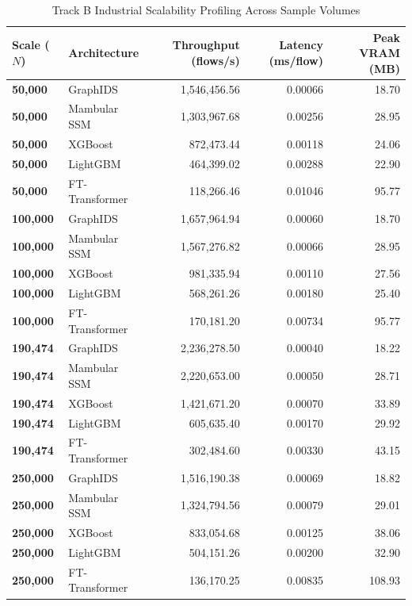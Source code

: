 \documentclass[10pt,a4paper]{article}
\begin{document}
\begin{table}[!ht]
\centering
\caption{Track B Industrial Scalability Profiling Across Sample Volumes}
\label{tab:scalability}
\footnotesize
\begin{tabular}{llrrr}
\toprule
\textbf{Scale ($N$)} & \textbf{Architecture} & \textbf{Throughput (flows/s)} & \textbf{Latency (ms/flow)} & \textbf{Peak VRAM (MB)} \\
\midrule
\textbf{50,000} & GraphIDS & 1,546,456.56 & 0.00066 & 18.70 \\
\textbf{50,000} & Mambular SSM & 1,303,967.68 & 0.00256 & 28.95 \\
\textbf{50,000} & XGBoost & 872,473.44 & 0.00118 & 24.06 \\
\textbf{50,000} & LightGBM & 464,399.02 & 0.00288 & 22.90 \\
\textbf{50,000} & FT-Transformer & 118,266.46 & 0.01046 & 95.77 \\
\midrule
\textbf{100,000} & GraphIDS & 1,657,964.94 & 0.00060 & 18.70 \\
\textbf{100,000} & Mambular SSM & 1,567,276.82 & 0.00066 & 28.95 \\
\textbf{100,000} & XGBoost & 981,335.94 & 0.00110 & 27.56 \\
\textbf{100,000} & LightGBM & 568,261.26 & 0.00180 & 25.40 \\
\textbf{100,000} & FT-Transformer & 170,181.20 & 0.00734 & 95.77 \\
\midrule
\textbf{190,474} & GraphIDS & 2,236,278.50 & 0.00040 & 18.22 \\
\textbf{190,474} & Mambular SSM & 2,220,653.00 & 0.00050 & 28.71 \\
\textbf{190,474} & XGBoost & 1,421,671.20 & 0.00070 & 33.89 \\
\textbf{190,474} & LightGBM & 605,635.40 & 0.00170 & 29.92 \\
\textbf{190,474} & FT-Transformer & 302,484.60 & 0.00330 & 43.15 \\
\midrule
\textbf{250,000} & GraphIDS & 1,516,190.38 & 0.00069 & 18.82 \\
\textbf{250,000} & Mambular SSM & 1,324,794.56 & 0.00079 & 29.01 \\
\textbf{250,000} & XGBoost & 833,054.68 & 0.00125 & 38.06 \\
\textbf{250,000} & LightGBM & 504,151.26 & 0.00200 & 32.90 \\
\textbf{250,000} & FT-Transformer & 136,170.25 & 0.00835 & 108.93 \\
\bottomrule
\end{tabular}
\end{table}
\end{document}
